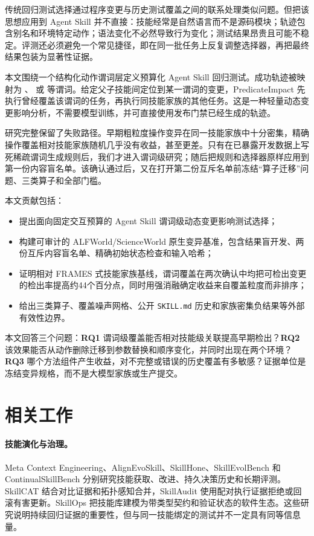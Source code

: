 \documentclass[10pt]{article}
\begin{document}
传统回归测试选择通过程序变更与历史测试覆盖之间的联系处理类似问题\citep{rothermel1996rts}。但把该思想应用到 Agent Skill 并不直接：技能经常是自然语言而不是源码模块；轨迹包含别名和环境特定动作；语法变化不必然导致行为变化；测试结果昂贵且可能不稳定。评测还必须避免一个常见捷径，即在同一批任务上反复调整选择器，再把最终结果包装为显著性证据。

本文围绕一个结构化动作谓词层定义预算化 Agent Skill 回归测试。成功轨迹被映射为 、 或  等谓词。给定父子技能间定位到某一谓词的变更，PredicateImpact 先执行曾经覆盖该谓词的任务，再执行同技能家族的其他任务。这是一种轻量动态变更影响分析，不需要模型训练，并可直接使用发布门禁已经生成的轨迹。

研究完整保留了失败路径。早期粗粒度操作变异在同一技能家族中十分密集，精确操作覆盖相对技能家族随机几乎没有收益，甚至更差。只有在已暴露开发数据上写死稀疏谓词生成规则后，我们才进入谓词级研究；随后把规则和选择器原样应用到第一份内容盲名单。该确认通过后，又在打开第二份互斥名单前冻结“算子迁移”问题、三类算子和全部门槛。

本文贡献包括：
\begin{itemize}
  \item 提出面向固定交互预算的 Agent Skill 谓词级动态变更影响测试选择；
  \item 构建可审计的 ALFWorld/ScienceWorld 原生变异基准，包含结果盲开发、两份互斥内容盲名单、精确初始状态检查和输入哈希；
  \item 证明相对 FRAMES 式技能家族基线，谓词覆盖在两次确认中均把可检出变更的检出率提高约44个百分点，同时用强消融确定收益来自覆盖粒度而非排序；
  \item 给出三类算子、覆盖噪声网格、公开 \texttt{SKILL.md} 历史和家族密集负结果等外部有效性边界。
\end{itemize}

本文回答三个问题：\textbf{RQ1} 谓词级覆盖能否相对技能级关联提高早期检出？\textbf{RQ2} 该效果能否从动作删除迁移到参数替换和顺序变化，并同时出现在两个环境？\textbf{RQ3} 哪个方法组件产生收益，对不完整或错误的历史覆盖有多敏感？证据单位是冻结变异规格，而不是大模型家族或生产提交。

\section{相关工作}
\paragraph{技能演化与治理。}
Meta Context Engineering、AlignEvoSkill、SkillHone、SkillEvolBench 和 ContinualSkillBench 分别研究技能获取、改进、持久决策历史和长期评测\citep{ye2026mce,wang2025alignevoskill,li2026skillhone,lei2026skillevolbench,guan2026continualskillbench}。SkillCAT 结合对比证据和拓扑感知合并，SkillAudit 使用配对执行证据拒绝或回滚有害更新\citep{chen2026skillcat,gao2026skillaudit}。SkillOps 把技能库建模为带类型契约和验证状态的软件生态\citep{song2026skillops}。这些研究说明持续回归证据的重要性，但与同一技能绑定的测试并不一定具有同等信息量。
\end{document}
